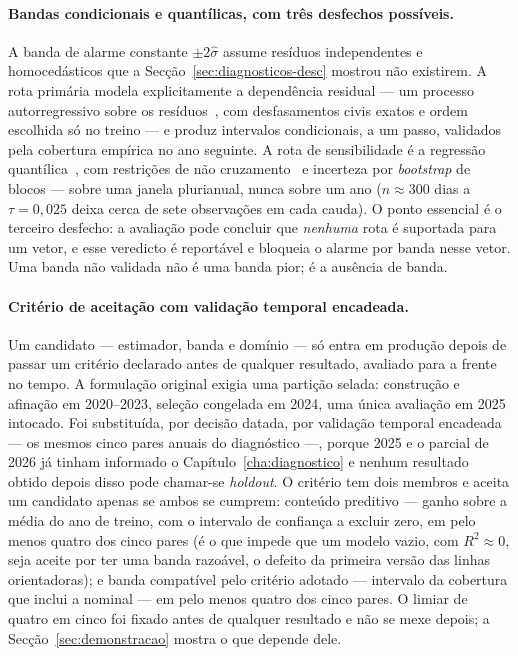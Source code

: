 \paragraph{Bandas condicionais e quantílicas, com três desfechos possíveis.} A banda de alarme
constante $\pm 2\hat\sigma$ assume resíduos independentes e homocedásticos que
a Secção~\ref{sec:diagnosticos-desc} mostrou não existirem. A rota primária
modela explicitamente a dependência residual --- um processo autorregressivo
sobre os resíduos~\cite{BoxJenkins2015}, com desfasamentos civis exatos e
ordem escolhida só no treino --- e produz intervalos condicionais, a um passo, validados pela
cobertura empírica no ano seguinte. A rota de sensibilidade é a regressão
quantílica~\cite{KoenkerBassett1978}, com restrições de não
cruzamento~\cite{Chernozhukov2010} e incerteza por \emph{bootstrap}
de blocos --- sobre uma janela plurianual, nunca sobre um ano ($n \approx
300$ dias a $\tau = 0{,}025$ deixa cerca de sete observações em cada cauda).
O ponto essencial é o terceiro desfecho: a avaliação pode concluir que
\emph{nenhuma} rota é suportada para um vetor, e esse veredicto é
reportável e bloqueia o alarme por banda nesse vetor. Uma banda não
validada não é uma banda pior; é a ausência de banda.

\paragraph{Critério de aceitação com validação temporal encadeada.} Um
candidato --- estimador, banda e domínio --- só entra em produção depois de
passar um critério declarado antes de qualquer resultado, avaliado para a
frente no tempo. A formulação original exigia uma partição selada: construção
e afinação em 2020--2023, seleção congelada em 2024, uma única avaliação em
2025 intocado. Foi substituída, por decisão datada, por validação temporal
encadeada --- os mesmos cinco pares anuais do diagnóstico ---, porque 2025 e
o parcial de 2026 já tinham informado o Capítulo~\ref{cha:diagnostico} e
nenhum resultado obtido depois disso pode chamar-se \emph{holdout}. O critério
tem dois membros e aceita um candidato apenas se ambos se cumprem: conteúdo
preditivo --- ganho sobre a média do ano de treino, com o intervalo de
confiança a excluir zero, em pelo menos quatro dos cinco pares (é o que
impede que um modelo vazio, com $R^2 \approx 0$, seja aceite por ter uma
banda razoável, o defeito da primeira versão das linhas orientadoras); e
banda compatível pelo critério adotado --- intervalo da cobertura que
inclui a nominal --- em pelo menos quatro dos cinco pares. O limiar de
quatro em cinco foi fixado antes de qualquer resultado e não se mexe depois;
a Secção~\ref{sec:demonstracao} mostra o que depende dele.


